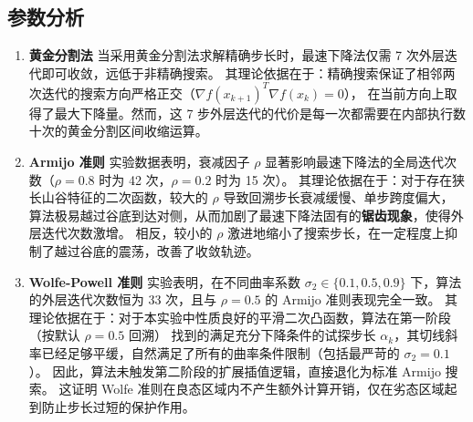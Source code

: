 \documentclass[12pt,a4paper]{ctexart}
\begin{document}
\subsection{参数分析}
\begin{enumerate}
    \item \textbf{黄金分割法}
    当采用黄金分割法求解精确步长时，最速下降法仅需 7 次外层迭代即可收敛，远低于非精确搜索。
    其理论依据在于：精确搜索保证了相邻两次迭代的搜索方向严格正交（$\nabla f(x_{k+1})^T \nabla f(x_k) = 0$），
    在当前方向上取得了最大下降量。然而，这 7 步外层迭代的代价是每一次都需要在内部执行数十次的黄金分割区间收缩运算。
    
    \item \textbf{Armijo 准则}
    实验数据表明，衰减因子 $\rho$ 显著影响最速下降法的全局迭代次数（$\rho=0.8$ 时为 42 次，$\rho=0.2$ 时为 15 次）。
    其理论依据在于：对于存在狭长山谷特征的二次函数，较大的 $\rho$ 导致回溯步长衰减缓慢、单步跨度偏大，
	算法极易越过谷底到达对侧，从而加剧了最速下降法固有的\textbf{锯齿现象}，使得外层迭代次数激增。
	相反，较小的 $\rho$ 激进地缩小了搜索步长，在一定程度上抑制了越过谷底的震荡，改善了收敛轨迹。
    
    \item \textbf{Wolfe-Powell 准则}
    实验表明，在不同曲率系数 $\sigma_2 \in \{0.1, 0.5, 0.9\}$ 下，算法的外层迭代次数恒为 33 次，且与 $\rho=0.5$ 的 Armijo 准则表现完全一致。
    其理论依据在于：对于本实验中性质良好的平滑二次凸函数，算法在第一阶段（按默认 $\rho=0.5$ 回溯）
	找到的满足充分下降条件的试探步长 $\alpha_k$，其切线斜率已经足够平缓，自然满足了所有的曲率条件限制（包括最严苛的 $\sigma_2=0.1$）。
	因此，算法未触发第二阶段的扩展插值逻辑，直接退化为标准 Armijo 搜索。
	这证明 Wolfe 准则在良态区域内不产生额外计算开销，仅在劣态区域起到防止步长过短的保护作用。
\end{enumerate}
\end{document}
